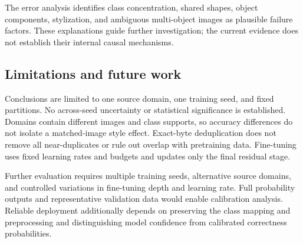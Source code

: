 \documentclass[10pt,a4paper]{article}
\begin{document}
The error analysis identifies class concentration, shared shapes, object components, stylization, and ambiguous multi-object images as plausible failure factors. These explanations guide further investigation; the current evidence does not establish their internal causal mechanisms.

\subsection{Limitations and future work}
Conclusions are limited to one source domain, one training seed, and fixed partitions. No across-seed uncertainty or statistical significance is established. Domains contain different images and class supports, so accuracy differences do not isolate a matched-image style effect. Exact-byte deduplication does not remove all near-duplicates or rule out overlap with pretraining data. Fine-tuning uses fixed learning rates and budgets and updates only the final residual stage.

Further evaluation requires multiple training seeds, alternative source domains, and controlled variations in fine-tuning depth and learning rate. Full probability outputs and representative validation data would enable calibration analysis. Reliable deployment additionally depends on preserving the class mapping and preprocessing and distinguishing model confidence from calibrated correctness probabilities.
\end{document}

